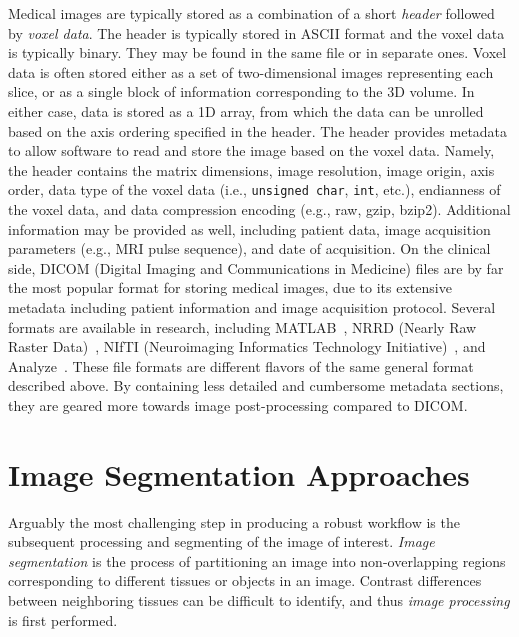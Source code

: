 Medical images are typically stored as a combination of a short \textit{header} followed by \textit{voxel data}. The header is typically stored in ASCII format and the voxel data is typically binary. They may be found in the same file or in separate ones. Voxel data is often stored either as a set of two-dimensional images representing each slice, or as a single block of information corresponding to the 3D volume. In either case, data is stored as a 1D array, from which the data can be unrolled based on the axis ordering specified in the header. The header provides metadata to allow software to read and store the image based on the voxel data. Namely, the header contains the matrix dimensions, image resolution, image origin, axis order, data type of the voxel data (i.e., \texttt{unsigned char}, \texttt{int}, etc.), endianness of the voxel data, and data compression encoding (e.g., raw, gzip, bzip2). Additional information may be provided as well, including patient data, image acquisition parameters (e.g., MRI pulse sequence), and date of acquisition. On the clinical side, DICOM (Digital Imaging and Communications in Medicine) files are by far the most popular format for storing medical images, due to its extensive metadata including patient information and image acquisition protocol. Several formats are available in research, including MATLAB~\cite{MATLAB}, NRRD (Nearly Raw Raster Data)~\cite{nrrd}, NIfTI (Neuroimaging Informatics Technology Initiative)~\cite{nifti}, and Analyze~\cite{analyze}. These file formats are different flavors of the same general format described above. By containing less detailed and cumbersome metadata sections, they are geared more towards image post-processing compared to DICOM.

\section{Image Segmentation Approaches}
\label{Image Segmentation Approaches}

Arguably the most challenging step in producing a robust workflow is the subsequent processing and segmenting of the image of interest. \textit{Image segmentation} is the process of partitioning an image into non-overlapping regions corresponding to different tissues or objects in an image. Contrast differences between neighboring tissues can be difficult to identify, and thus \textit{image processing} is first performed.

